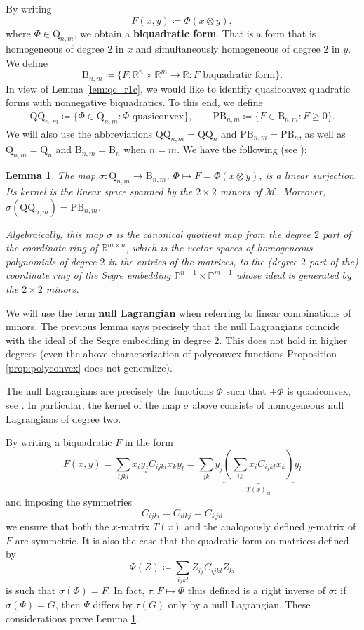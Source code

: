 \documentclass[a4paper]{article}
\numberwithin{equation}{section}
\newcommand{\R}{\mathbb{R}}
\renewcommand{\P}{\mathbb{P}}
\newtheorem{lemma}[theorem]{Lemma}
\theoremstyle{definition}
\theoremstyle{remark}
\newcommand{\qnm}{\mathrm{Q}_{n,m}}
\newcommand{\qn}{\mathrm{Q}_{n}}
\newcommand{\bnm}{\mathrm{B}_{n,m}}
\newcommand{\bn}{\mathrm{B}_{n}}
\newcommand{\qqnm}{\mathrm{QQ}_{n,m}}
\newcommand{\qqn}{\mathrm{QQ}_{n}}
\newcommand{\pbnm}{\mathrm{PB}_{n,m}}
\newcommand{\pbn}{\mathrm{PB}_{n}}
\begin{document}
By writing 
\begin{equation}\label{eq:def_bq}
F(x,y)\coloneqq \Phi(x\otimes y),
\end{equation}
where $\Phi\in\qnm$, we obtain a \textbf{biquadratic form}.  That is a form that is homogeneous of degree $2$ in $x$ and simultaneously homogeneous of degree $2$ in $y$. We define 
$$
\bnm\coloneqq \{F\colon\R^{n}\times \R^m\rightarrow \R\colon F\text{ biquadratic form}\}.
$$
In view of Lemma \ref{lem:qc_r1c}, we would like to identify quasiconvex quadratic forms with nonnegative biquadratics. To this end, we define
\begin{align*}
    \qqnm \coloneqq \{\Phi\in\qnm\colon \Phi\text{ quasiconvex}\}, \qquad
    \pbnm \coloneqq \{F\in\bnm\colon F\geq 0\}.
\end{align*}
We will also use the abbreviations $\qqnm=\qqn$ and $\pbnm=\pbn$, as well as $\qnm=\qn$ and $\bnm=\bn$ when $n=m$. We have the following (see \cite[Ex. 2.11]{HarriszbMATH00052497}):

\begin{lemma}\label{lem:sigma}
The map $\sigma\colon \qnm \to \bnm$, $\Phi\mapsto F = \Phi(x\otimes y)$, is a linear surjection. Its kernel is the linear space spanned by the $2\times 2$ minors of $\mathcal{M}$.
Moreover, $\sigma(\qqnm)=\pbnm$. 

Algebraically, this map $\sigma$ is the canonical quotient map from the degree $2$ part of the coordinate ring of $\R^{m\times n}$, which is the vector spaces of homogeneous polynomials of degree $2$ in the entries of the matrices, to the (degree $2$ part of the) coordinate ring of the Segre embedding $\P^{n-1}\times \P^{m-1}$ whose ideal is generated by the $2\times 2$ minors.
\end{lemma}
We will use the term \textbf{null Lagrangian} when referring to linear combinations of minors. The previous lemma says precisely that the null Lagrangians coincide with the ideal of the Segre embedding in degree $2$. This does not hold in higher degrees (even the above characterization of polyconvex functions Proposition \ref{prop:polyconvex} does not generalize). 

The null Lagrangians are precisely the functions $\Phi$ such that $\pm \Phi$ is quasiconvex, see \cite[Thm. 5.20]{Dacorogna}. In particular, the kernel of the map $\sigma$ above consists of homogeneous null Lagrangians of degree two.

By writing a biquadratic $F$ in the form
$$
F(x,y)=\sum_{ijkl}x_iy_jC_{ijkl}x_ky_l=\sum_{jk}y_j\underbrace{\left(\sum_{ik}x_iC_{ijkl}x_k\right)}_{T(x)_{kl}}y_l
$$
and imposing the symmetries 
$$
C_{ijkl}=C_{ilkj}=C_{kjil}
$$
we ensure that both the $x$-matrix $T(x)$ and the analogously defined $y$-matrix of $F$ are symmetric. It is also the case that the quadratic form on matrices defined by
$$
\Phi(Z)\coloneqq\sum_{ijkl}Z_{ij}C_{ijkl}Z_{kl}
$$
is such that $\sigma(\Phi)=F$. In fact, $\tau\colon F\mapsto \Phi$ thus defined is a right inverse of $\sigma$: if $\sigma(\Psi)=G$, then $\Psi$ differs by $\tau(G)$ only by a null Lagrangian. These considerations prove Lemma \ref{lem:sigma}.
\end{document}
